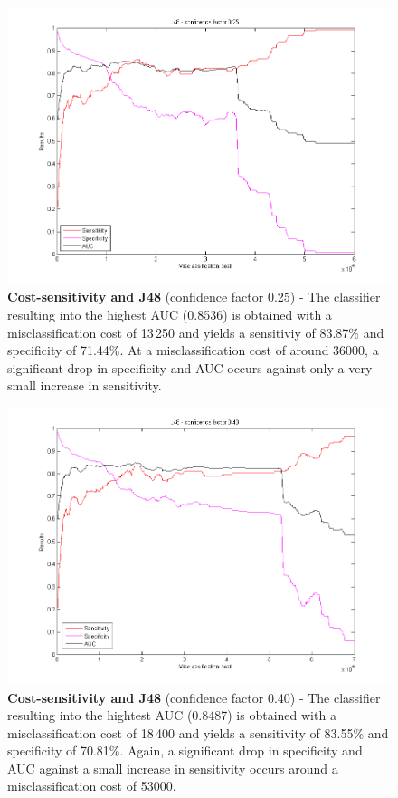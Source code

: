 \newpage
\begin{figure}[h]
\includegraphics[scale=0.65]{img/J48-confid025.png}
\caption{\textbf{Cost-sensitivity and J48} (confidence factor 0.25) - The classifier resulting into the highest AUC (0.8536) is obtained with a misclassification cost of 13\,250 and yields a sensitiviy of 83.87\% and specificity of 71.44\%. At a misclassification cost of around 36000, a significant drop in specificity and AUC occurs against only a very small increase in sensitivity.}
\end{figure}

\newpage
\begin{figure}[h]
\includegraphics[scale=0.65]{img/J48-confid040.png}
\caption{\textbf{Cost-sensitivity and J48} (confidence factor 0.40) - The classifier resulting into the hightest AUC (0.8487) is obtained with a misclassification cost of 18\,400 and yields a sensitivity of 83.55\% and specificity of 70.81\%.  Again, a significant drop in specificity and AUC against a small increase in sensitivity occurs around a misclassification cost of 53000.}
\end{figure}

